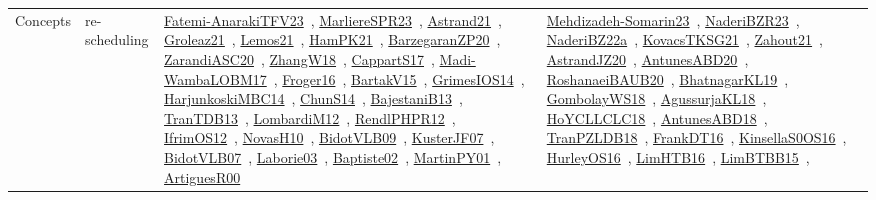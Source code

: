 {\begin{longtable}{lp{3cm}>{\raggedright\arraybackslash}p{6cm}>{\raggedright\arraybackslash}p{6cm}>{\raggedright\arraybackslash}p{8cm}}
\index{re-scheduling}\index{Concepts!re-scheduling}Concepts & re-scheduling & \href{../works/Fatemi-AnarakiTFV23.pdf}{Fatemi-AnarakiTFV23}~\cite{Fatemi-AnarakiTFV23}, \href{../works/MarliereSPR23.pdf}{MarliereSPR23}~\cite{MarliereSPR23}, \href{../works/Astrand21.pdf}{Astrand21}~\cite{Astrand21}, \href{../works/Groleaz21.pdf}{Groleaz21}~\cite{Groleaz21}, \href{../works/Lemos21.pdf}{Lemos21}~\cite{Lemos21}, \href{../works/HamPK21.pdf}{HamPK21}~\cite{HamPK21}, \href{../works/BarzegaranZP20.pdf}{BarzegaranZP20}~\cite{BarzegaranZP20}, \href{../works/ZarandiASC20.pdf}{ZarandiASC20}~\cite{ZarandiASC20}, \href{../works/ZhangW18.pdf}{ZhangW18}~\cite{ZhangW18}, \href{../works/CappartS17.pdf}{CappartS17}~\cite{CappartS17}, \href{../works/Madi-WambaLOBM17.pdf}{Madi-WambaLOBM17}~\cite{Madi-WambaLOBM17}, \href{../works/Froger16.pdf}{Froger16}~\cite{Froger16}, \href{../works/BartakV15.pdf}{BartakV15}~\cite{BartakV15}, \href{../works/GrimesIOS14.pdf}{GrimesIOS14}~\cite{GrimesIOS14}, \href{../works/HarjunkoskiMBC14.pdf}{HarjunkoskiMBC14}~\cite{HarjunkoskiMBC14}, \href{../works/ChunS14.pdf}{ChunS14}~\cite{ChunS14}, \href{../works/BajestaniB13.pdf}{BajestaniB13}~\cite{BajestaniB13}, \href{../works/TranTDB13.pdf}{TranTDB13}~\cite{TranTDB13}, \href{../works/LombardiM12.pdf}{LombardiM12}~\cite{LombardiM12}, \href{../works/RendlPHPR12.pdf}{RendlPHPR12}~\cite{RendlPHPR12}, \href{../works/IfrimOS12.pdf}{IfrimOS12}~\cite{IfrimOS12}, \href{../works/NovasH10.pdf}{NovasH10}~\cite{NovasH10}, \href{../works/BidotVLB09.pdf}{BidotVLB09}~\cite{BidotVLB09}, \href{../works/KusterJF07.pdf}{KusterJF07}~\cite{KusterJF07}, \href{../works/BidotVLB07.pdf}{BidotVLB07}~\cite{BidotVLB07}, \href{../works/Laborie03.pdf}{Laborie03}~\cite{Laborie03}, \href{../works/Baptiste02.pdf}{Baptiste02}~\cite{Baptiste02}, \href{../works/MartinPY01.pdf}{MartinPY01}~\cite{MartinPY01}, \href{../works/ArtiguesR00.pdf}{ArtiguesR00}~\cite{ArtiguesR00} & \href{../works/Mehdizadeh-Somarin23.pdf}{Mehdizadeh-Somarin23}~\cite{Mehdizadeh-Somarin23}, \href{../works/NaderiBZR23.pdf}{NaderiBZR23}~\cite{NaderiBZR23}, \href{../works/NaderiBZ22a.pdf}{NaderiBZ22a}~\cite{NaderiBZ22a}, \href{../works/KovacsTKSG21.pdf}{KovacsTKSG21}~\cite{KovacsTKSG21}, \href{../works/Zahout21.pdf}{Zahout21}~\cite{Zahout21}, \href{../works/AstrandJZ20.pdf}{AstrandJZ20}~\cite{AstrandJZ20}, \href{../works/AntunesABD20.pdf}{AntunesABD20}~\cite{AntunesABD20}, \href{../works/RoshanaeiBAUB20.pdf}{RoshanaeiBAUB20}~\cite{RoshanaeiBAUB20}, \href{../works/BhatnagarKL19.pdf}{BhatnagarKL19}~\cite{BhatnagarKL19}, \href{../works/GombolayWS18.pdf}{GombolayWS18}~\cite{GombolayWS18}, \href{../works/AgussurjaKL18.pdf}{AgussurjaKL18}~\cite{AgussurjaKL18}, \href{../works/HoYCLLCLC18.pdf}{HoYCLLCLC18}~\cite{HoYCLLCLC18}, \href{../works/AntunesABD18.pdf}{AntunesABD18}~\cite{AntunesABD18}, \href{../works/TranPZLDB18.pdf}{TranPZLDB18}~\cite{TranPZLDB18}, \href{../works/FrankDT16.pdf}{FrankDT16}~\cite{FrankDT16}, \href{../works/KinsellaS0OS16.pdf}{KinsellaS0OS16}~\cite{KinsellaS0OS16}, \href{../works/HurleyOS16.pdf}{HurleyOS16}~\cite{HurleyOS16}, \href{../works/LimHTB16.pdf}{LimHTB16}~\cite{LimHTB16}, \href{../works/LimBTBB15.pdf}{LimBTBB15}~\cite{LimBTBB15}, 
\end{longtable}}
